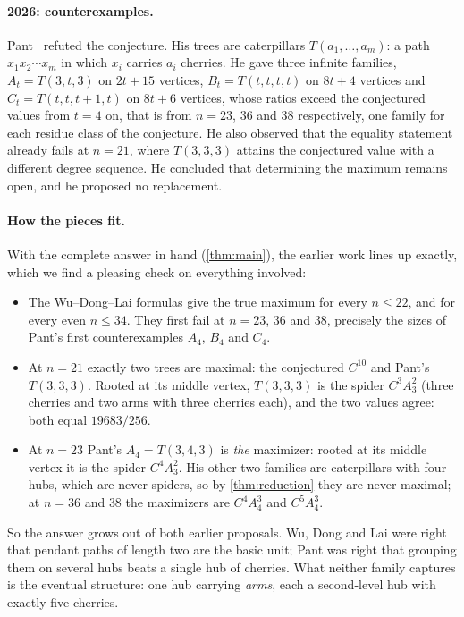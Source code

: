 \documentclass[11pt]{article}
\theoremstyle{definition}
\begin{document}
\paragraph{2026: counterexamples.} Pant~\cite{Pant2026} refuted the conjecture. His trees are
caterpillars $T(a_1,\dots,a_m)$: a path $x_1x_2\cdots x_m$ in which $x_i$ carries $a_i$ cherries. He gave
three infinite families, $A_t=T(3,t,3)$ on $2t+15$ vertices, $B_t=T(t,t,t,t)$ on $8t+4$ vertices and
$C_t=T(t,t,t+1,t)$ on $8t+6$ vertices, whose ratios exceed the conjectured values from $t=4$ on, that is
from $n=23$, $36$ and $38$ respectively, one family for each residue class of the conjecture. He also
observed that the equality statement already fails at $n=21$, where $T(3,3,3)$ attains the conjectured
value with a different degree sequence. He concluded that determining the maximum remains open, and he
proposed no replacement.

\paragraph{How the pieces fit.} With the complete answer in hand (\cref{thm:main}), the earlier work
lines up exactly, which we find a pleasing check on everything involved:
\begin{itemize}
\item The Wu--Dong--Lai formulas give the true maximum for every $n\le22$, and for every even $n\le34$.
  They first fail at $n=23$, $36$ and $38$, precisely the sizes of Pant's first counterexamples $A_4$,
  $B_4$ and $C_4$.
\item At $n=21$ exactly two trees are maximal: the conjectured $C^{10}$ and Pant's $T(3,3,3)$. Rooted at
  its middle vertex, $T(3,3,3)$ is the spider $C^3A_3^2$ (three cherries and two arms with three cherries
  each), and the two values agree: both equal $19683/256$.
\item At $n=23$ Pant's $A_4=T(3,4,3)$ is \emph{the} maximizer: rooted at its middle vertex it is the
  spider $C^4A_3^2$. His other two families are caterpillars with four hubs, which are never spiders, so by
  \cref{thm:reduction} they are never maximal; at $n=36$ and $38$ the maximizers are $C^4A_4^3$ and
  $C^5A_4^3$.
\end{itemize}
So the answer grows out of both earlier proposals. Wu, Dong and Lai were right that pendant paths of
length two are the basic unit; Pant was right that grouping them on several hubs beats a single hub of
cherries. What neither family captures is the eventual structure: one hub carrying \emph{arms}, each a
second-level hub with exactly five cherries.
\end{document}
